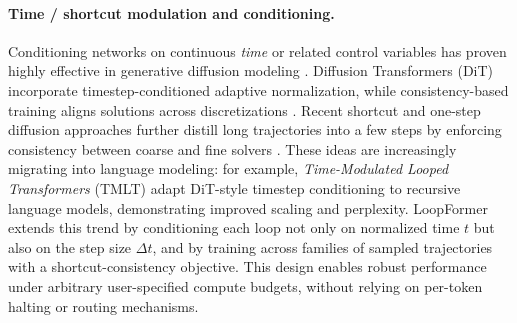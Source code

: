 \paragraph{Time / shortcut modulation and conditioning.}
Conditioning networks on continuous \emph{time} or related control variables has proven highly effective in generative diffusion modeling \cite{ho2020denoising, rombach2022high, lipman2022flow}. Diffusion Transformers (DiT) \cite{peebles2023scalable} incorporate timestep-conditioned adaptive normalization, while consistency-based training aligns solutions across discretizations \cite{song2023consistency}. Recent shortcut and one-step diffusion approaches further distill long trajectories into a few steps by enforcing consistency between coarse and fine solvers \cite{frans2024one, lu2024simplifying}. These ideas are increasingly migrating into language modeling: for example, \emph{Time-Modulated Looped Transformers} (TMLT) \cite{xu2024expressive} adapt DiT-style timestep conditioning to recursive language models, demonstrating improved scaling and perplexity. LoopFormer extends this trend by conditioning each loop not only on normalized time $t$ but also on the step size $\Delta t$, and by training across families of sampled trajectories with a shortcut-consistency objective. This design enables robust performance under arbitrary user-specified compute budgets, without relying on per-token halting or routing mechanisms.




